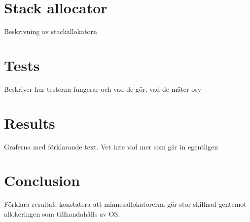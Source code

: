 \documentclass{article}
\begin{document}
\section{Stack allocator}
Beskrivning av stackallokatorn

\section{Tests}
Beskriver hur testerna fungerar och vad de gör, vad de mäter osv

\section{Results}
Graferna med förklarande text. Vet inte vad mer som går in egentligen

\section{Conclusion}
Förklara resultat, konstatera att minnesallokatorerna gör stor skillnad gentemot allokeringen som tillhandahålls av OS.
\end{document}
